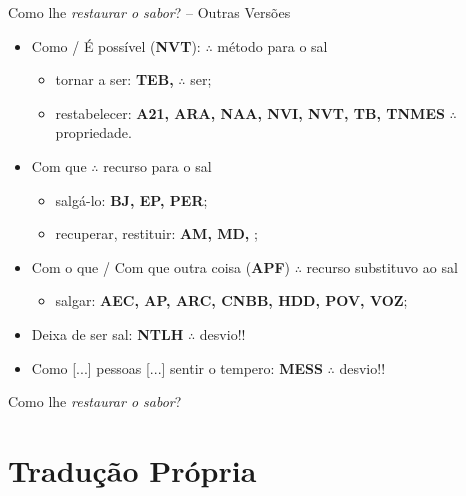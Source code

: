 \documentclass[12pt,aspectratio=169]{beamer}
\newcommand{\ORA}[1]{{\textcolor{TXora}{#1}}}
\newcommand{\YEL}[1]{{\textcolor{TXyel}{#1}}}
\newcommand{\BRI}[1]{{\textcolor{BSpbg}{#1}}}   %
\begin{document}
    \begin{frame}{\BRI{Como lhe \textit{restaurar o sabor\/}? -- Outras Versões}}
        \begin{itemize}
            \item<1-> \YEL{Como} / \YEL{É possível} (\BRI{\bf NVT}): $\therefore$ método para o
                sal
                \begin{itemize}
                    \item<1-> \YEL{tornar a ser}: \BRI{\textbf{TEB, }} $\therefore$ ser;
                    \item<2-> \YEL{restabelecer}: \BRI{\textbf{A21, ARA, NAA, NVI, NVT, TB, TNMES}} $\therefore$ propriedade.
                \end{itemize}
            \item<3-> \YEL{Com que} $\therefore$ recurso para o sal
                \begin{itemize}
                    \item<3-> \YEL{salgá-lo}: \BRI{\textbf{BJ, EP, PER}};
                    \item<4-> \YEL{recuperar, restituir}: \BRI{\textbf{AM, MD, }};
                \end{itemize}
            \item<6-> \YEL{Com o que} / \YEL{Com que outra coisa} (\BRI{\bf APF}) $\therefore$ recurso substituvo ao sal
                \begin{itemize}
                    \item<7-> \YEL{salgar}: \BRI{\textbf{AEC, AP, ARC, CNBB, HDD, POV, VOZ}};
                \end{itemize}
            \item<8-> \YEL{Deixa de ser sal}: \BRI{\textbf{NTLH}} $\therefore$ desvio!!
            \item<9-> \ORA{Como [...] pessoas [...] sentir o tempero}: \BRI{\textbf{MESS}}
                $\therefore$ desvio!!
        \end{itemize}
    \end{frame}

    \begin{frame}{\BRI{Como lhe \YEL{\textit{restaurar o sabor\/}}?}}
    \end{frame}

\section{Tradução Própria}
\end{document}
